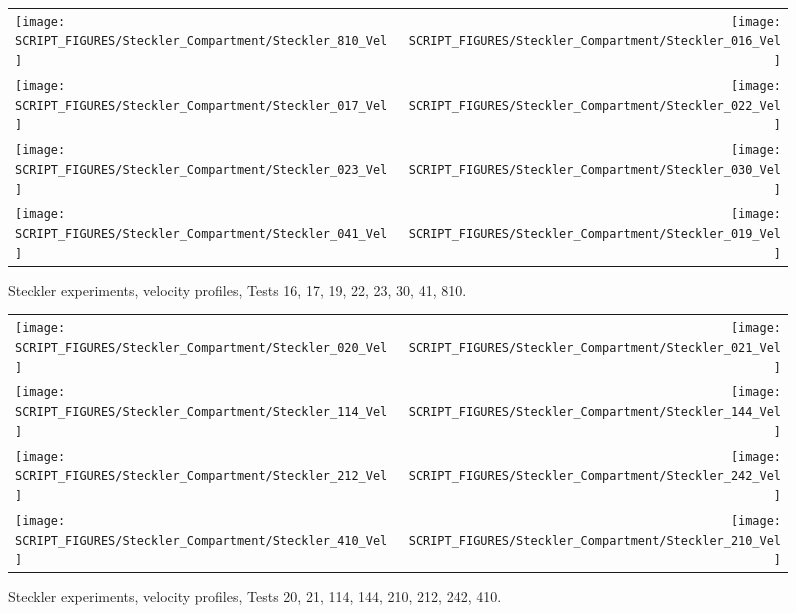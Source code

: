 \begin{figure}[p]
\begin{tabular*}{\textwidth}{l@{\extracolsep{\fill}}r}
\texttt{[image: SCRIPT\_FIGURES/Steckler\_Compartment/Steckler\_810\_Vel]} &
\texttt{[image: SCRIPT\_FIGURES/Steckler\_Compartment/Steckler\_016\_Vel]} \\
\texttt{[image: SCRIPT\_FIGURES/Steckler\_Compartment/Steckler\_017\_Vel]} &
\texttt{[image: SCRIPT\_FIGURES/Steckler\_Compartment/Steckler\_022\_Vel]} \\
\texttt{[image: SCRIPT\_FIGURES/Steckler\_Compartment/Steckler\_023\_Vel]} &
\texttt{[image: SCRIPT\_FIGURES/Steckler\_Compartment/Steckler\_030\_Vel]} \\
\texttt{[image: SCRIPT\_FIGURES/Steckler\_Compartment/Steckler\_041\_Vel]} &
\texttt{[image: SCRIPT\_FIGURES/Steckler\_Compartment/Steckler\_019\_Vel]}
\end{tabular*}
\caption{Steckler experiments, velocity profiles, Tests 16, 17, 19, 22, 23, 30, 41, 810.}
\label{Steckler_Vel_2}
\end{figure}

\begin{figure}[p]
\begin{tabular*}{\textwidth}{l@{\extracolsep{\fill}}r}
\texttt{[image: SCRIPT\_FIGURES/Steckler\_Compartment/Steckler\_020\_Vel]} &
\texttt{[image: SCRIPT\_FIGURES/Steckler\_Compartment/Steckler\_021\_Vel]} \\
\texttt{[image: SCRIPT\_FIGURES/Steckler\_Compartment/Steckler\_114\_Vel]} &
\texttt{[image: SCRIPT\_FIGURES/Steckler\_Compartment/Steckler\_144\_Vel]} \\
\texttt{[image: SCRIPT\_FIGURES/Steckler\_Compartment/Steckler\_212\_Vel]} &
\texttt{[image: SCRIPT\_FIGURES/Steckler\_Compartment/Steckler\_242\_Vel]} \\
\texttt{[image: SCRIPT\_FIGURES/Steckler\_Compartment/Steckler\_410\_Vel]} &
\texttt{[image: SCRIPT\_FIGURES/Steckler\_Compartment/Steckler\_210\_Vel]}
\end{tabular*}
\caption{Steckler experiments, velocity profiles, Tests 20, 21, 114, 144, 210, 212, 242, 410.}
\label{Steckler_Vel_3}
\end{figure}

